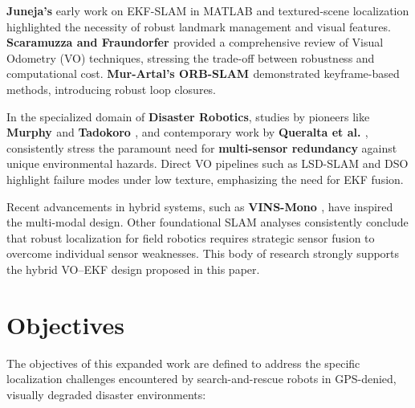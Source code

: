 \documentclass[conference]{IEEEtran}
\begin{document}
\textbf{Juneja’s} early work on EKF-SLAM in MATLAB \cite{Juneja2013} and textured-scene localization \cite{Juneja2014} highlighted the necessity of robust landmark management and visual features. \textbf{Scaramuzza and Fraundorfer \cite{scaramuzza2011}} provided a comprehensive review of Visual Odometry (VO) techniques, stressing the trade-off between robustness and computational cost. \textbf{Mur-Artal’s ORB-SLAM \cite{mur2015}} demonstrated keyframe-based methods, introducing robust loop closures.

In the specialized domain of \textbf{Disaster Robotics}, studies by pioneers like \textbf{Murphy \cite{murphy2014}} and \textbf{Tadokoro \cite{tadokoro2009}}, and contemporary work by \textbf{Queralta et al. \cite{queralta2020}}, consistently stress the paramount need for \textbf{multi-sensor redundancy} against unique environmental hazards. Direct VO pipelines such as LSD-SLAM \cite{engel2014} and DSO \cite{engel2017} highlight failure modes under low texture, emphasizing the need for EKF fusion.

Recent advancements in hybrid systems, such as \textbf{VINS-Mono \cite{qin2018}}, have inspired the multi-modal design. Other foundational SLAM analyses \cite{forster2014, cadena2016} consistently conclude that robust localization for field robotics requires strategic sensor fusion to overcome individual sensor weaknesses. This body of research strongly supports the hybrid VO–EKF design proposed in this paper.

\section{Objectives}

The objectives of this expanded work are defined to address the specific localization challenges encountered by search-and-rescue robots in GPS-denied, visually degraded disaster environments:
\end{document}
